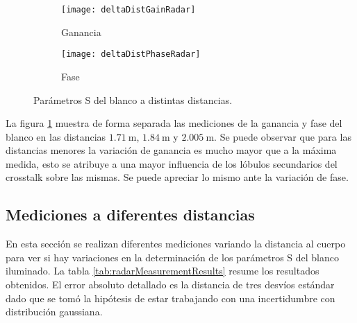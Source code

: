 \begin{figure}[H]
  \centering
  \begin{subfigure}{0.49\textwidth}
    \texttt{[image: deltaDistGainRadar]}
    \caption{Ganancia}
  \end{subfigure}
  \begin{subfigure}{0.49\textwidth}
    \texttt{[image: deltaDistPhaseRadar]}
    \caption{Fase}
  \end{subfigure}
  \caption{Parámetros S del blanco a distintas distancias.}
  \label{fig:deltaDistRadar}
\end{figure}
La figura \ref{fig:deltaDistRadar} muestra de forma separada las mediciones de la ganancia y fase del blanco en las distancias $\SI{1.71}{\meter}$, $\SI{1.84}{\meter}$ y $\SI{2.005}{\meter}$. Se puede observar que para las distancias menores la variación de ganancia es mucho mayor que a la máxima medida, esto se atribuye a una mayor influencia de los lóbulos secundarios del crosstalk sobre las mismas. Se puede apreciar lo mismo ante la variación de fase.


\subsection{Mediciones a diferentes distancias}

En esta sección se realizan diferentes mediciones variando la distancia al cuerpo para ver si hay variaciones en la determinación de los parámetros S del blanco iluminado. La tabla \ref{tab:radarMeasurementResults} resume los resultados obtenidos. El error absoluto detallado es la distancia de tres desvíos estándar dado que se tomó la hipótesis de estar trabajando con una incertidumbre con distribución gaussiana.

